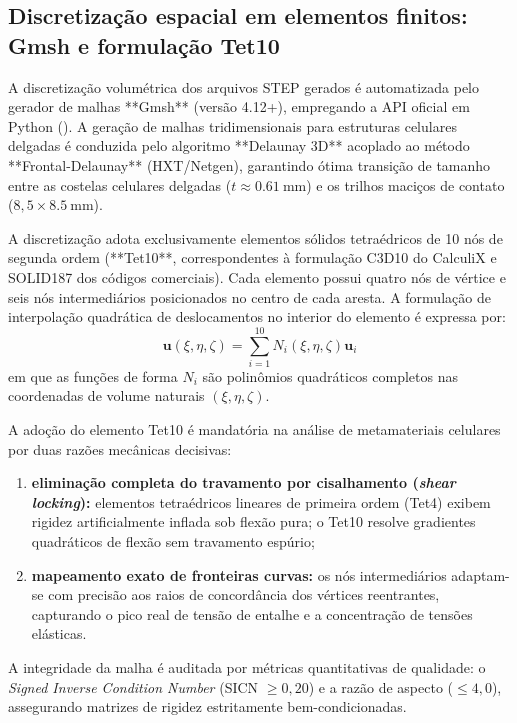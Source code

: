 \subsection{Discretização espacial em elementos finitos: Gmsh e formulação Tet10}
\label{subsec:gmsh-stack}

A discretização volumétrica dos arquivos STEP gerados é automatizada pelo gerador de malhas **Gmsh** (versão 4.12+), empregando a API oficial em Python (). A geração de malhas tridimensionais para estruturas celulares delgadas é conduzida pelo algoritmo **Delaunay 3D** acoplado ao método **Frontal-Delaunay** (HXT/Netgen), garantindo ótima transição de tamanho entre as costelas celulares delgadas ($t \approx \SI{0.61}{\milli\metre}$) e os trilhos maciços de contato ($8{,}5 \times \SI{8.5}{\milli\metre}$).

A discretização adota exclusivamente elementos sólidos tetraédricos de 10 nós de segunda ordem (**Tet10**, correspondentes à formulação C3D10 do CalculiX e SOLID187 dos códigos comerciais). Cada elemento possui quatro nós de vértice e seis nós intermediários posicionados no centro de cada aresta. A formulação de interpolação quadrática de deslocamentos no interior do elemento é expressa por:
\begin{equation}
  \mathbf{u}(\xi, \eta, \zeta) = \sum_{i=1}^{10} N_i(\xi, \eta, \zeta) \mathbf{u}_i
  \label{eq:tet10-forma}
\end{equation}
em que as funções de forma $N_i$ são polinômios quadráticos completos nas coordenadas de volume naturais $(\xi, \eta, \zeta)$. 

A adoção do elemento Tet10 é mandatória na análise de metamateriais celulares por duas razões mecânicas decisivas:
\begin{enumerate}
  \item \textbf{eliminação completa do travamento por cisalhamento (\textit{shear locking}):} elementos tetraédricos lineares de primeira ordem (Tet4) exibem rigidez artificialmente inflada sob flexão pura; o Tet10 resolve gradientes quadráticos de flexão sem travamento espúrio;
  \item \textbf{mapeamento exato de fronteiras curvas:} os nós intermediários adaptam-se com precisão aos raios de concordância dos vértices reentrantes, capturando o pico real de tensão de entalhe e a concentração de tensões elásticas.
\end{enumerate}
A integridade da malha é auditada por métricas quantitativas de qualidade: o \textit{Signed Inverse Condition Number} (SICN $\ge 0{,}20$) e a razão de aspecto ($\le 4{,}0$), assegurando matrizes de rigidez estritamente bem-condicionadas.

